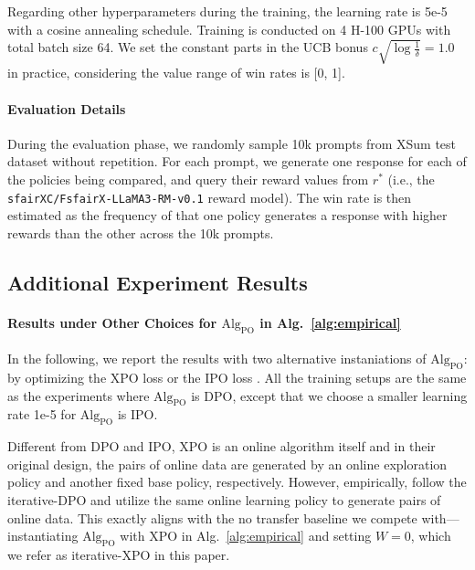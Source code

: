 Regarding other hyperparameters during the training, the learning rate is 5e-5 with a cosine annealing schedule.
Training is conducted on 4 H-100 GPUs with total batch size 64.
We set the constant parts in the UCB bonus $c \sqrt{\log\frac{1}{\delta}} = 1.0$ in practice, considering the value range of win rates is [0, 1].


\paragraph{Evaluation Details}
During the evaluation phase, we randomly sample 10k prompts from XSum test dataset without repetition. 
For each prompt, we generate one response for each of the policies being compared, and query their reward values from $r^*$ (i.e., the \texttt{sfairXC}\texttt{/FsfairX-LLaMA3-RM-v0.1} reward model).
The win rate is then estimated as the frequency of that one policy generates a response with higher rewards than the other across the 10k prompts.

\subsection{Additional Experiment Results}\label{appx:additional_results}

\paragraph{Results under Other Choices for $\text{Alg}_{\text{PO}}$ in Alg.~\ref{alg:empirical}}
In the following, we report the results with two alternative instaniations of $\text{Alg}_{\text{PO}}$: by optimizing the XPO loss \citep{xie2024exploratory} or the IPO loss \citep{azar2024general}.
All the training setups are the same as the experiments where $\text{Alg}_{\text{PO}}$ is DPO, except that we choose a smaller learning rate 1e-5 for $\text{Alg}_{\text{PO}}$ is IPO.

\begin{remark}
    Different from DPO and IPO, XPO is an online algorithm itself and in their original design, the pairs of online data are generated by an online exploration policy and another fixed base policy, respectively.
    However, empirically, \citet{xie2024exploratory} follow the iterative-DPO and utilize the same online learning policy to generate pairs of online data.
    This exactly aligns with the no transfer baseline we compete with---instantiating $\text{Alg}_{\text{PO}}$ with XPO in Alg.~\ref{alg:empirical} and setting $W=0$, which we refer as iterative-XPO in this paper.
\end{remark}

